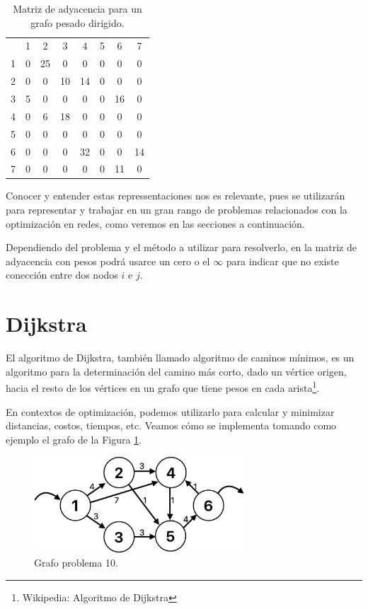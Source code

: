 \documentclass[12pt]{article}  %
\begin{document}
\begin{table}
\centering
\caption{Matriz de adyacencia para un grafo pesado dirigido.}
\label{tab:matAdjEjem2}
\begin{tabular}{cccccccc}
&1&2&3&4&5&6&7\\
1&0&25&0&0&0&0&0\\
2&0&0&10&14&0&0&0\\
3&5&0&0&0&0&16&0\\
4&0&6&18&0&0&0&0\\
5&0&0&0&0&0&0&0\\
6&0&0&0&32&0&0&14\\
7&0&0&0&0&0&11&0
\end{tabular}
\end{table}

Conocer y entender estas repressentaciones nos es relevante, pues se utilizarán para representar y trabajar en un gran rango de problemas relacionados con la optimización en redes, como veremos en las secciones a continuación.

Dependiendo del problema y el método a utilizar para resolverlo, en la matriz de adyacencia con pesos podrá usarce un cero o el $\infty$ para indicar que no existe conección entre dos nodos $i$ e $j$.

\section{Dijkstra}
El algoritmo de Dijkstra, también llamado algoritmo de caminos mínimos, es un algoritmo para la determinación del camino más corto, dado un vértice origen, hacia el resto de los vértices en un grafo que tiene pesos en cada arista\footnote{Wikipedia: Algoritmo de Dijkstra}.

En contextos de optimización, podemos utilizarlo para calcular y minimizar distancias, costos, tiempos, etc. Veamos cómo se implementa tomando como ejemplo el grafo de la Figura \ref{fig:grafoProb10}.

\begin{figure}[H]
\centering
\caption{Grafo problema 10.}
\label{fig:grafoProb10}
\includegraphics[width=0.7\textwidth]{grafoProb10.png}
\end{figure}
\end{document}
